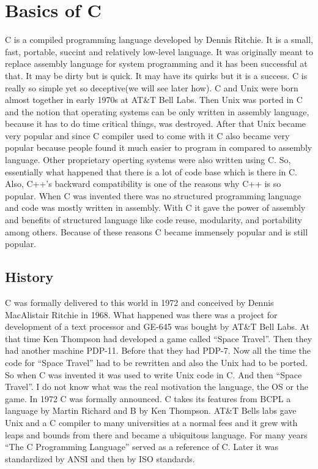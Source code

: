 \chapter{Basics of C}
C is a compiled programming language developed by Dennis Ritchie. It is a
small, fast, portable, succint  and relatively low-level language. It was
originally meant to replace assembly language for system programming and it has
been successful at that. It may be dirty but is quick. It may have its quirks
but it is a success. C is really so simple yet so deceptive(we will see later
how). C and Unix were born almost together in early 1970s at AT\&T Bell
Labs. Then Unix was ported in C and the notion that operating systems can be
only written in assembly language, because it has to do time critical things,
was destroyed. After that Unix became very popular and since C compiler used to
come with it C also became very popular because people found it much easier to
program in compared to assembly language. Other proprietary operting systems
were also written using C. So, essentially what happened that there is a lot of
code base which is there in C. Also, C++’s backward compatibility is one of the
reasons why C++ is so popular. When C was invented there was no structured
programming language and code was mostly written in assembly. With C it gave
the power of assembly and benefits of structured language like code reuse,
modularity, and portability among others. Because of these reasons C became
immensely popular and is still popular.

\section{History}
C was formally delivered to this world in 1972 and conceived by Dennis
MacAlistair Ritchie in 1968. What happened was there was a project for
development of a text processor and GE-645 was bought by AT\&T Bell Labs. At
that time Ken Thompson had developed a game called ``Space Travel''. Then they
had another machine PDP-11. Before that they had PDP-7. Now all the time the
code for ``Space Travel'' had to be rewritten and also the Unix had to be
ported. So when C was invented it was used to write Unix code in C. And then
``Space Travel''. I do not know what was the real motivation the language, the
OS or the game. In 1972 C was formally announced. C takes its features from
BCPL a language by Martin Richard and B by Ken Thompson. AT\&T Bells labs gave
Unix and a C compiler to many universities at a normal fees and it grew with
leaps and bounds from there and became a ubiquitous language. For many years
``The C Programming Language'' served as a reference of C. Later it was
standardized by ANSI and then by ISO standards.

